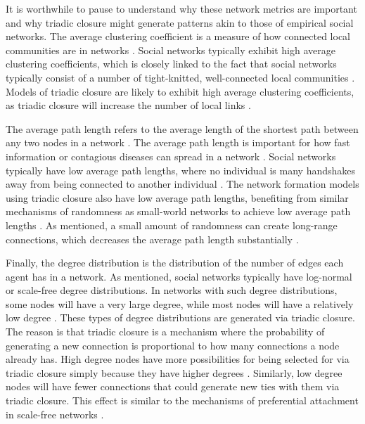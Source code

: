 \documentclass[11pt]{article}
\begin{document}
\noindent It is worthwhile to pause to understand why these network metrics are important and why triadic closure might generate patterns akin to those of empirical social networks. The average clustering coefficient is a measure of how connected local communities are in networks \cite{watts_collective_1998}. Social networks typically exhibit high average clustering coefficients, which is closely linked to the fact that social networks typically consist of a number of tight-knitted, well-connected local communities \cite{peixoto_disentangling_2022, newman_finding_2006, crandall_feedback_2008}. Models of triadic closure are likely to exhibit high average clustering coefficients, as triadic closure will increase the number of local links \cite{jacksonmeeting2007}. 

The average path length refers to the average length of the shortest path between any two nodes in a network \cite{watts_collective_1998}. The average path length is important for how fast information or contagious diseases can spread in a network \cite{cowan2004network}. Social networks typically have low average path lengths, where no individual is many handshakes away from being connected to another individual \cite{backstrom2012four}. The network formation models using triadic closure also have low average path lengths, benefiting from similar mechanisms of randomness as small-world networks to achieve low average path lengths \cite{jacksonmeeting2007,watts_collective_1998}. As mentioned, a small amount of randomness can create long-range connections, which decreases the average path length substantially \cite{watts_networks_1999}.  

Finally, the degree distribution is the distribution of the number of edges each agent has in a network. As mentioned, social networks typically have log-normal or scale-free degree distributions. In networks with such degree distributions, some nodes will have a very large degree, while most nodes will have a relatively low degree \cite{bianconi_triadic_2014}. These types of degree distributions are generated via triadic closure. The reason is that triadic closure is a mechanism where the probability of generating a new connection is proportional to how many connections a node already has. High degree nodes have more possibilities for being selected for via triadic closure simply because they have higher degrees \cite{jacksonmeeting2007}. Similarly, low degree nodes will have fewer connections that could generate new ties with them via triadic closure. This effect is similar to the mechanisms of preferential attachment in scale-free networks \cite{barabasi_scale-free_2003}.
\end{document}
